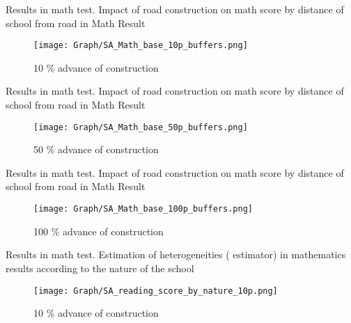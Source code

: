 \documentclass[9pt]{beamer}
\begin{document}
\begin{frame}{ Results in math test.  \hyperlink{result_math}{} }\label{10p_math_buf}
\small Impact of road construction on math score by distance of school from road in Math Result
\begin{figure}
  \centering
  \texttt{[image: Graph/SA\_Math\_base\_10p\_buffers.png]} 
  \caption{\small 10 \% advance of construction}
  \label{fig:6.1sub-first}
\end{figure}

\end{frame}
\begin{frame}{ Results in math test.  \hyperlink{result_math}{} }\label{50p_math_buf}
\small Impact of road construction on math score by distance of school from road in Math Result
\begin{figure}
  \centering
  \texttt{[image: Graph/SA\_Math\_base\_50p\_buffers.png]} 
  \caption{\small 50 \% advance of construction}
  \label{fig:6.1sub-first}
\end{figure}

\end{frame}
\begin{frame}{ Results in math test.   \hyperlink{result_math}{} }\label{100p_math_buf}
\small Impact of road construction on math score by distance of school from road in Math Result
\begin{figure}
  \centering
  \texttt{[image: Graph/SA\_Math\_base\_100p\_buffers.png]} 
  \caption{\small 100 \% advance of construction}
 
\end{figure}

\end{frame}






\begin{frame}{ Results in math test.  \hyperlink{result_math}{} }\label{10p_math_nat}
\small Estimation of heterogeneities (\cite{SUN2021175} estimator) in mathematics results according to the nature of the school  
\begin{figure}
  \centering
  \texttt{[image: Graph/SA\_reading\_score\_by\_nature\_10p.png]} 
  \caption{\small 10 \% advance of construction}
  \label{fig:6.1sub-first}
\end{figure}
\end{frame}
\end{document}
